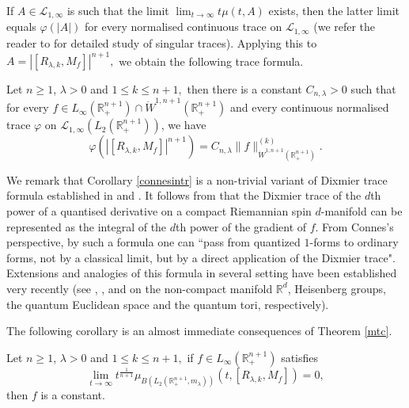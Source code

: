 \documentclass[12pt]{amsart}
\begin{document}
If $A\in\mathcal{L}_{1,\infty}$ is such that the limit $\lim_{t\to\infty}t\mu(t,A)$ exists, then the latter limit equals $\varphi(|A|)$ for every normalised continuous trace on $\mathcal{L}_{1,\infty}$ (we refer the reader to \cite{LSZold,LSZ1} for detailed study of singular traces). Applying this to $A=|[R_{\lambda,k},M_f]|^{n+1},$ we obtain the following trace formula.
\begin{coro}\label{connesintr}
Let $n\geq1$, $\lambda>0$ and $1\leq k\leq n+1,$ then there is a constant $C_{n,\lambda}>0$ such that for every $f\in L_{\infty}(\mathbb{R}^{n+1}_+)\cap\dot{W}^{1,n+1}(\mathbb{R}^{n+1}_+)$ and every continuous normalised trace $\varphi$ on $\mathcal{L}_{1,\infty}(L_2(\mathbb{R}^{n+1}_+))$, we have
$$\varphi(|[R_{\lambda,k},M_f]|^{n+1})=C_{n,\lambda}\|f\|_{\dot{W}^{1,n+1}(\mathbb{R}_+^{n+1})}^{(k)}.$$
\end{coro}
We remark that Corollary \ref{connesintr} is a non-trivial variant of Dixmier trace formula established in \cite[Theorem 2]{LMSZ} and \cite[Theorem 3 (iii)]{Connes1998}. It follows from  \cite[Theorem 3 (iii)]{Connes1998} that the Dixmier trace of the $d$th power of a quantised derivative on a compact Riemannian spin $d$-manifold can be represented as the integral of the $d$th power of the gradient of $f$. From Connes's perspective, by such a formula one can ``pass from quantized $1$-forms to ordinary forms, not by a classical limit, but by a direct application of the Dixmier trace". Extensions and analogies of this formula \cite[Theorem 3 (iii)]{Connes1998} in several setting have been established very recently (see \cite{LMSZ}, \cite{MR4654013}, \cite{MSX2019} and \cite{MSX2018} on the non-compact manifold $\mathbb{R}^d$, Heisenberg groups, the quantum Euclidean space and the quantum tori, respectively).



The following corollary is an almost immediate consequences of Theorem \ref{mtc}.
\begin{coro}
Let $n\geq1$, $\lambda>0$ and $1\leq k\leq n+1,$ if $f\in L_\infty(\mathbb{R}_+^{n+1})$ satisfies
$$\lim_{t\to\infty}t^{\frac1{n+1}}\mu_{B(L_2(\mathbb{R}^{n+1}_+,m_{\lambda}))}(t,[R_{\lambda,k},M_f])=0,$$
then $f$ is a constant.
\end{coro}
%
%
\end{document}
